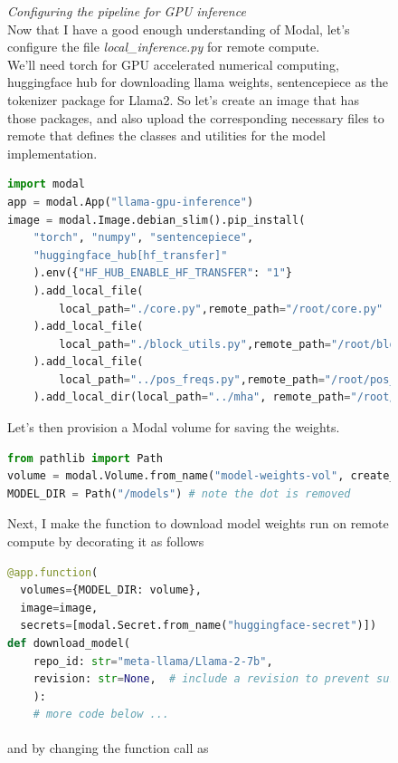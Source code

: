 \documentclass[12pt]{article}
\newcommand{\customtext}[3]{%
    \vspace{#2} %
    \fontsize{13}{8}\textcolor{#1}{\textit{#3}}%
}
\newcommand{\sidecite}[1]{\textsuperscript{\textcolor{blue}{\textbf{\scriptsize#1}}}}
\newcommand{\maincitecount}{\sidecite{\stepcounter{maincite}\themaincite}}
\begin{document}
\begin{figure}[!htb]
    \begin{minipage}[t]{0.65\textwidth}
    \customtext{xtitle}{0em}{Configuring the pipeline for GPU inference}\\
Now that I have a good enough understanding of Modal, let's configure the file
{\it \small local\_inference.py} for remote compute.\\
We'll need torch for GPU accelerated numerical computing, huggingface hub for downloading 
llama weights, sentencepiece as the tokenizer package for Llama2. So let's create 
an image that has those packages, and also upload the corresponding necessary files to remote 
that defines the classes and utilities for the model implementation.

\begin{lstlisting}[language=python,style=python,basicstyle=\ttfamily\scriptsize]
import modal 
app = modal.App("llama-gpu-inference")
image = modal.Image.debian_slim().pip_install(
    "torch", "numpy", "sentencepiece",
    "huggingface_hub[hf_transfer]"
    ).env({"HF_HUB_ENABLE_HF_TRANSFER": "1"}
    ).add_local_file(
        local_path="./core.py",remote_path="/root/core.py"
    ).add_local_file(
        local_path="./block_utils.py",remote_path="/root/block_utils.py"
    ).add_local_file(
        local_path="../pos_freqs.py",remote_path="/root/pos_freqs.py"
    ).add_local_dir(local_path="../mha", remote_path="/root/mha")
\end{lstlisting}
Let's then provision a Modal volume for saving the weights. 
\begin{lstlisting}[language=python,style=python,basicstyle=\ttfamily\footnotesize]
from pathlib import Path
volume = modal.Volume.from_name("model-weights-vol", create_if_missing=True)
MODEL_DIR = Path("/models") # note the dot is removed
\end{lstlisting}
Next, I make the function to download model weights run on remote compute by decorating it as follows
\begin{lstlisting}[language=python,style=python,basicstyle=\ttfamily\footnotesize]
@app.function(
  volumes={MODEL_DIR: volume},
  image=image,
  secrets=[modal.Secret.from_name("huggingface-secret")])
def download_model(
    repo_id: str="meta-llama/Llama-2-7b",
    revision: str=None,  # include a revision to prevent surprises!
    ):
    # more code below ...
\end{lstlisting}
and by changing the function call as{\maincitecount} 
\begin{lstlisting}[language=python,style=python,basicstyle=\ttfamily\footnotesize]

\end{lstlisting}
\end{minipage}
\end{figure}
\end{document}
